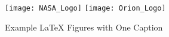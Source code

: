\begin{figure}[H]
   \centering
   \texttt{[image: NASA\_Logo]}%
   \hspace{1in}%
   \texttt{[image: Orion\_Logo]}%
   \caption{Example LaTeX Figures with One Caption} 
   \label{fig:NASA_Logo_Orion_Logo}
\end{figure}